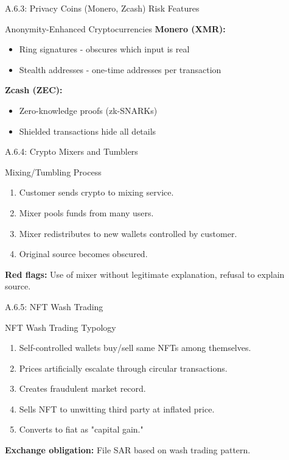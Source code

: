 \documentclass{beamer}
\begin{document}
	\begin{frame}{A.6.3: Privacy Coins (Monero, Zcash) Risk Features}
		\begin{block}{Anonymity-Enhanced Cryptocurrencies}
			\textbf{Monero (XMR):}
			\begin{itemize}
				\item Ring signatures - obscures which input is real
				\item Stealth addresses - one-time addresses per transaction
			\end{itemize}
			\textbf{Zcash (ZEC):}
			\begin{itemize}
				\item Zero-knowledge proofs (zk-SNARKs)
				\item Shielded transactions hide all details
			\end{itemize}
		\end{block}
	\end{frame}
	
	\begin{frame}{A.6.4: Crypto Mixers and Tumblers}
		\begin{block}{Mixing/Tumbling Process}
			\begin{enumerate}
				\item Customer sends crypto to mixing service.
				\item Mixer pools funds from many users.
				\item Mixer redistributes to new wallets controlled by customer.
				\item Original source becomes obscured.
			\end{enumerate}
		\end{block}
		\textbf{Red flags:} Use of mixer without legitimate explanation, refusal to explain source.
	\end{frame}
	
	\begin{frame}{A.6.5: NFT Wash Trading}
		\begin{block}{NFT Wash Trading Typology}
			\begin{enumerate}
				\item Self-controlled wallets buy/sell same NFTs among themselves.
				\item Prices artificially escalate through circular transactions.
				\item Creates fraudulent market record.
				\item Sells NFT to unwitting third party at inflated price.
				\item Converts to fiat as "capital gain."
			\end{enumerate}
		\end{block}
		\textbf{Exchange obligation:} File SAR based on wash trading pattern.
	\end{frame}
	
\end{document}
